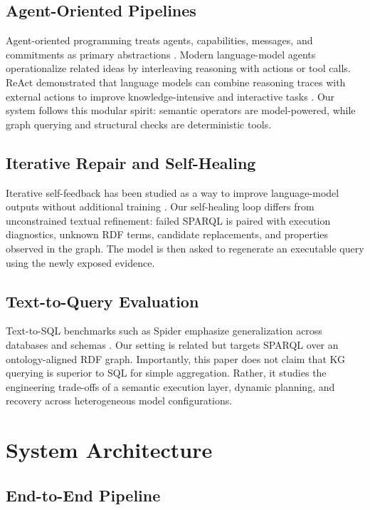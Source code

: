 \documentclass[11pt]{article}
\begin{document}
\subsection{Agent-Oriented Pipelines}

Agent-oriented programming treats agents, capabilities, messages, and commitments as primary abstractions \cite{shoham1993aop}. Modern language-model agents operationalize related ideas by interleaving reasoning with actions or tool calls. ReAct demonstrated that language models can combine reasoning traces with external actions to improve knowledge-intensive and interactive tasks \cite{yao2023react}. Our system follows this modular spirit: semantic operators are model-powered, while graph querying and structural checks are deterministic tools.

\subsection{Iterative Repair and Self-Healing}

Iterative self-feedback has been studied as a way to improve language-model outputs without additional training \cite{madaan2023selfrefine}. Our self-healing loop differs from unconstrained textual refinement: failed SPARQL is paired with execution diagnostics, unknown RDF terms, candidate replacements, and properties observed in the graph. The model is then asked to regenerate an executable query using the newly exposed evidence.

\subsection{Text-to-Query Evaluation}

Text-to-SQL benchmarks such as Spider emphasize generalization across databases and schemas \cite{yu2018spider}. Our setting is related but targets SPARQL over an ontology-aligned RDF graph. Importantly, this paper does not claim that KG querying is superior to SQL for simple aggregation. Rather, it studies the engineering trade-offs of a semantic execution layer, dynamic planning, and recovery across heterogeneous model configurations.

\section{System Architecture}

\subsection{End-to-End Pipeline}
\end{document}
